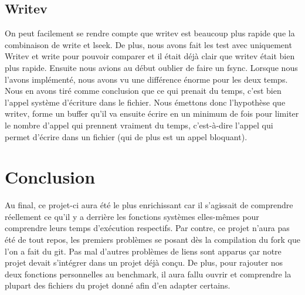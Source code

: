 \documentclass[11pt, oneside]{article}
\begin{document}
\begin{multicols}{2}
\subsection{Writev}

\begin{center}


\end{center}
On peut facilement se rendre compte que writev est beaucoup plus rapide que la combinaison de write et lseek. De plus, nous avons fait les test avec uniquement Writev et write pour pouvoir comparer et il était déjà clair que writev était bien plus rapide. Ensuite nous avions au début oublier de faire un fsync. Lorsque nous l'avons implémenté, nous avons vu une différence énorme pour les deux temps. Nous en avons tiré comme conclusion que ce qui prenait du temps, c'est bien l'appel système d'écriture dans le fichier. Nous émettons donc l'hypothèse que writev, forme un buffer qu'il va ensuite écrire en un minimum de fois pour limiter le nombre d'appel qui prennent vraiment du temps, c'est-à-dire l'appel qui permet d'écrire dans un fichier (qui de plus est un appel bloquant).


\section{Conclusion}
Au final, ce projet-ci aura été le plus enrichissant car il s'agissait de comprendre réellement ce qu'il y a derrière les fonctions systèmes elles-mêmes pour comprendre leurs temps d'exécution respectifs. Par contre, ce projet n'aura pas été de tout repos, les premiers problèmes se posant dès la compilation du fork que l'on a fait du git. Pas mal d'autres problèmes de liens sont apparus çar notre projet devait s'intégrer dans un projet déjà conçu. De plus, pour rajouter nos deux fonctions personnelles au benchmark, il aura fallu ouvrir et comprendre la plupart des fichiers du projet donné afin d'en adapter certains. 
\end{multicols}
\end{document}
